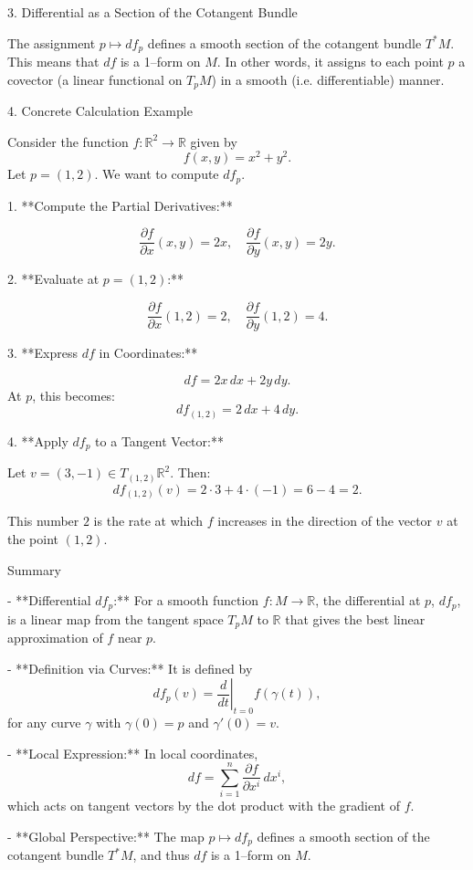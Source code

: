 \documentclass[11pt,openany]{article}
\begin{document}
 3. Differential as a Section of the Cotangent Bundle

The assignment \( p \mapsto df_p \) defines a smooth section of the cotangent bundle \( T^*M \). This means that \( df \) is a 1–form on \( M \). In other words, it assigns to each point \( p \) a covector (a linear functional on \( T_pM \)) in a smooth (i.e. differentiable) manner.

4. Concrete Calculation Example

Consider the function \( f \colon \mathbb{R}^2 \to \mathbb{R} \) given by
\[
f(x,y) = x^2 + y^2.
\]
Let \( p = (1,2) \). We want to compute \( df_p \).

1. **Compute the Partial Derivatives:**

\[
\frac{\partial f}{\partial x}(x,y) = 2x,\quad \frac{\partial f}{\partial y}(x,y) = 2y.
\]

2. **Evaluate at \( p = (1,2) \):**

\[
\frac{\partial f}{\partial x}(1,2) = 2, \quad \frac{\partial f}{\partial y}(1,2) = 4.
\]

3. **Express \( df \) in Coordinates:**

\[
df = 2x\,dx + 2y\,dy.
\]
At \( p \), this becomes:
\[
df_{(1,2)} = 2\,dx + 4\,dy.
\]

4. **Apply \( df_p \) to a Tangent Vector:**

Let \( v = (3, -1) \in T_{(1,2)}\mathbb{R}^2 \). Then:
\[
df_{(1,2)}(v) = 2\cdot 3 + 4\cdot (-1) = 6 - 4 = 2.
\]

This number \( 2 \) is the rate at which \( f \) increases in the direction of the vector \( v \) at the point \( (1,2) \).

 Summary

- **Differential \( df_p \):**  
For a smooth function \( f \colon M \to \mathbb{R} \), the differential at \( p \), \( df_p \), is a linear map from the tangent space \( T_pM \) to \( \mathbb{R} \) that gives the best linear approximation of \( f \) near \( p \).

- **Definition via Curves:**  
It is defined by
\[
df_p(v) = \left. \frac{d}{dt} \right|_{t=0} f(\gamma(t)),
\]
for any curve \( \gamma \) with \( \gamma(0)=p \) and \( \gamma'(0)=v \).

- **Local Expression:**  
In local coordinates,
\[
df = \sum_{i=1}^n \frac{\partial f}{\partial x^i}\,dx^i,
\]
which acts on tangent vectors by the dot product with the gradient of \( f \).

- **Global Perspective:**  
The map \( p \mapsto df_p \) defines a smooth section of the cotangent bundle \( T^*M \), and thus \( df \) is a 1–form on \( M \).
\end{document}
